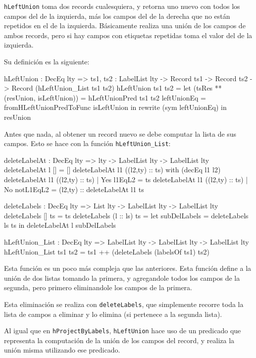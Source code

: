 \texttt{hLeftUnion} toma dos records cualesquiera, y retorna uno nuevo con todos los campos del de la izquierda, más los campos del de la derecha que no están repetidos en el de la izquierda. Básicamente realiza una unión de los campos de ambos records, pero si hay campos con etiquetas repetidas toma el valor del de la izquierda.

Su definición es la siguiente:

\begin{code}
hLeftUnion : DecEq lty => {ts1, ts2 : LabelList lty} -> 
  Record ts1 -> Record ts2 -> Record (hLeftUnion_List ts1 ts2)
hLeftUnion ts1 ts2 =
  let (tsRes ** (resUnion, isLeftUnion)) = 
        hLeftUnionPred ts1 ts2
      leftUnionEq = fromHLeftUnionPredToFunc isLeftUnion
  in rewrite (sym leftUnionEq) in resUnion 
\end{code}

Antes que nada, al obtener un record nuevo se debe computar la lista de sus campos. Esto se hace con la función \texttt{hLeftUnion\_List}:

\begin{code}
deleteLabelAt : DecEq lty => lty -> LabelList lty -> 
  LabelList lty
deleteLabelAt l [] = []
deleteLabelAt l1 ((l2,ty) :: ts) with (decEq l1 l2)
  deleteLabelAt l1 ((l2,ty) :: ts) | Yes l1EqL2 = ts
  deleteLabelAt l1 ((l2,ty) :: ts) | No notL1EqL2 = 
    (l2,ty) :: deleteLabelAt l1 ts

deleteLabels : DecEq lty => List lty -> LabelList lty -> 
  LabelList lty
deleteLabels [] ts = ts
deleteLabels (l :: ls) ts = 
  let subDelLabels = deleteLabels ls ts
  in deleteLabelAt l subDelLabels

hLeftUnion_List : DecEq lty => LabelList lty -> 
  LabelList lty -> LabelList lty
hLeftUnion_List ts1 ts2 = 
  ts1 ++ (deleteLabels (labelsOf ts1) ts2)
\end{code}

Esta función es un poco más compleja que las anteriores. Esta función define a la unión de dos listas tomando la primera, y agregandole todos los campos de la segunda, pero primero eliminandole los campos de la primera.

Esta eliminación se realiza con \texttt{deleteLabels}, que simplemente recorre toda la lista de campos a eliminar y lo elimina (si pertenece a la segunda lista).

Al igual que en \texttt{hProjectByLabels}, \texttt{hLeftUnion} hace uso de un predicado que representa la computación de la unión de los campos del record, y realiza la unión misma utilizando ese predicado.

